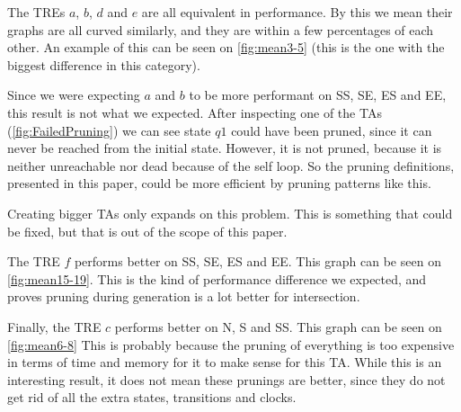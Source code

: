 \vspace{.5\baselineskip plus 2pt}
The TREs $a$, $b$, $d$ and $e$ are all equivalent in performance.
By this we mean their graphs are all curved similarly, and they are within a few percentages of each other.
An example of this can be seen on \cref{fig:mean3-5} (this is the one with the biggest difference in this category).

\resizebox{\columnwidth}{!}{
    
}

\resizebox{\columnwidth}{!}{
    
}
\label{fig:mean3-5}
\vspace{0.75em}

Since we were expecting $a$ and $b$ to be more performant on SS, SE, ES and EE, this result is not what we expected.
After inspecting one of the TAs (\cref{fig:FailedPruning}) we can see state $q1$ could have been pruned, since it can never be reached from the initial state.
However, it is not pruned, because it is neither unreachable nor dead because of the self loop.
So the pruning definitions, presented in this paper, could be more efficient by pruning patterns like this.


\label{fig:FailedPruning}
\vspace{0.75em}

Creating bigger TAs only expands on this problem. This is something that could be fixed, but that is out of the scope of this paper.

\vspace{.5\baselineskip plus 2pt}
The TRE $f$ performs better on SS, SE, ES and EE.
This graph can be seen on \cref{fig:mean15-19}.
This is the kind of performance difference we expected, and proves pruning during generation is a lot better for intersection.

\resizebox{\columnwidth}{!}{
    
}

\resizebox{\columnwidth}{!}{
    
}
\label{fig:mean15-19}
\vspace{0.75em}

Finally, the TRE $c$ performs better on N, S and SS.
This graph can be seen on \cref{fig:mean6-8}
This is probably because the pruning of everything is too expensive in terms of time and memory for it to make sense for this TA.
While this is an interesting result, it does not mean these prunings are better, since they do not get rid of all the extra states, transitions and clocks.

